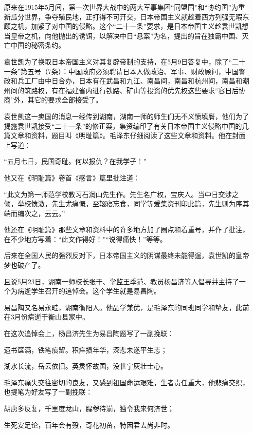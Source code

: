 \documentclass[../../dazhuan.tex]{subfiles}
\begin{document}
原来在1915年5月间，第一次世界大战中的两大军事集团“同盟国”和“协约国”为重新瓜分世界，争夺殖民地，正打得不可开交，日本帝国主义就趁着西方列强无暇东顾之机，加紧了对中国的侵略。这个“二十一条”要求，是日本帝国主义趁袁世凯想当皇帝之机，向他抛出的诱饵，以解决中日“悬案”为名，提出的旨在独霸中国、灭亡中国的秘密条约。

袁世凯为了换取日本帝国主义对其复辟帝制的支持，在5月9日答复中，除了“二十一条”第五号（7条）：中国政府必须聘请日本人做政治、军事、财政顾问，中国警政和兵工厂由中日合办，日本有在武昌和九江、南昌间，南昌和杭州间，南昌和潮州间的筑路权，有在福建省内进行铁路、矿山等投资的优先权这些要求“容日后协商”外，其它的要求全部接受了。

袁世凯这一卖国的消息一经传到湖南，湖南一师的师生们无不义愤填膺，他们为了揭露袁世凯接受“二十一条”的修正案，集资编印了有关日本帝国主义侵略中国的几篇文章和资料，题目叫《明耻篇》。毛泽东仔细阅读了这些文章和资料。他在封面上写道：

“五月七日，民国奇耻。何以报仇？在我学子！”

他又在《明耻篇》卷首《感言》篇里批注道：

“此文为第一师范学校教习石润山先生作。先生名广权，宝庆人。当中日交涉之倾，举校愤激，先生尤痛慨，至辍寝忘食，同学等爰集资刊印此篇，先生则为序其端而编次之，云云。”

他还在《明耻篇》那些文章和资料中的许多地方加了圈点和着重号，并作了批注，在不少地方写着：“此文作得好！”“说得痛快！”等等。

后来在全国人民的强烈反对下，日本帝国主义的阴谋最终未能得逞，袁世凯的皇帝梦也破产了。

且说5月23日，湖南一师校长张干、学监王季范、教员杨昌济等人倡导并主持了一个为病逝学生召开的追悼会。这个学生就是易昌陶。

易昌陶又名易永畦，湖南衡阳人。他品学兼优，是毛泽东的同班同学和挚友，此前在3月份病逝于衡山县家中。

在这次追悼会上，杨昌济先生为易昌陶题写了一副挽联：

\begin{couplet}
遗书箧满，铁笔痕留。积瘁损年华，深悲未遂平生志；

湖水长流，岳云依旧。英灵怀故国，没世宁灰壮士心。
\end{couplet}

毛泽东痛失交往密切的良友，又感到祖国命运艰难，生者责任重大，他悲痛交织，也提笔为好友写了一副挽联：

\begin{couplet}
胡虏多反复，千里度龙山，腥秽待湔，独令我来何济世；

生死安足论，百年会有殁，奇花初茁，特因君去尚非时。
\end{couplet}
\end{document}

